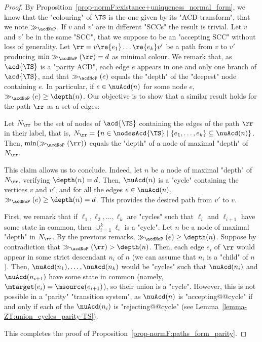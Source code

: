 \documentclass{theoretics}
\begin{document}
\begin{proof}
	By Proposition~\ref{prop-normF:existance+uniqueness_normal_form}, we know that the "colouring" of $\TS$ is the one given by its "ACD-transform", that we note $\gg_{\acdNoP}$. 
	If $v$ and $v'$ are in different "SCCs" the result is trivial.  
	Let $v$ and $v'$ be in the same "SCC", that we suppose to be an "accepting SCC" without loss of generality. %
	Let $\rr = v\re{e_1}\dots \re{e_k} v'$ be a path from $v$ to $v'$ producing $\min \gg_{\acdNoP}(\rr) = d$ as minimal colour.
	We remark that, as $\acd{\TS}$ is a "parity ACD", each edge $e$ appears in one and only one branch of $\acd{\TS}$, and that $\gg_{\acdNoP}(e)$ equals the "depth" of the "deepest" node containing $e$. In particular, if $e\in\nuAcd(n)$ for some node $e$, $\gg_{\acdNoP}(e)\geq \depth(n)$. Our objective is to show that a similar result holds for the path $\rr$ as a set of edges:
	\begin{claim}\label{claim-normF:priority-path}
		Let $N_{\rr}$ be the set of nodes of $\acd{\TS}$ containing the edges of the path $\rr$ in their label, that is, $N_{\rr} = \{n\in \nodesAcd{\TS} \mid \{e_1,\dots, e_k\}\subseteq \nuAcd(n)\}$.
		Then, $\min (\gg_{\acdNoP}(\rr))$ equals the "depth" of a node of maximal "depth" of $N_\rr$.\footnotemark{}
	\end{claim}
	This claim allows us to conclude. Indeed, let $n$ be a node of maximal "depth" of $N_\rr$, verifying $\depth(n)=d$. Then, $\nuAcd(n)$ is a "cycle" containing the vertices $v$ and $v'$, and for all the edges $e\in \nuAcd(n)$, $\gg_{\acdNoP}(e)\geq \depth(n)=d$. This provides the desired path from $v'$ to $v$.
	
	\begin{subproof}
		First, we remark that if $\ell_1, \ell_2,\dots, \ell_k$ are "cycles" such that $\ell_i$ and $\ell_{i+1}$ have some state in common, then $\cup_{i=1}^k \ell_i$ is a "cycle". Let $n$ be a node of maximal "depth" in $N_\rr$. By the previous remarks, $\gg_{\acdNoP}(e)\geq \depth(n)$. Suppose by contradiction that $\gg_{\acdNoP}(\rr)> \depth(n)$. Then, each edge $e_i$ of $\rr$ would appear in some strict descendant $n_i$ of $n$ (we can assume that $n_i$ is a "child" of $n$). Then, $\nuAcd(n_1), \dots, \nuAcd(n_k)$ would be "cycles" such that $\nuAcd(n_i)$ and $\nuAcd(n_{i+1})$ have some state in common (namely, $\mtarget(e_i) = \msource(e_{i+1})$), so their union is a "cycle". However, this is not possible in a "parity" "transition system", as $\nuAcd(n)$ is "accepting@@cycle" if and only if each of the $\nuAcd(n_i)$ is "rejecting@@cycle" (see Lemma~\ref{lemma-ZT:union_cycles_parity-TS}).
	\end{subproof} 
  This completes the proof of Proposition~\ref{prop-normF:paths_form_parity}.
\end{proof}
\end{document}
